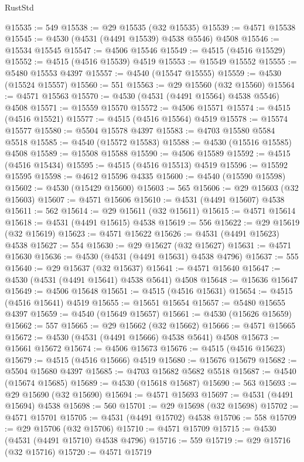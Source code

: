 \begin{lexlean}{RustStd}
\begin{coremodule}
{\begin{coremodule}
{{{{{{{{{{{{{{{{{{{{{{{{{{{{{{{{{{{{{{{{{{{{{{{{{{{{{{{@15535 := 549
@15538 := @29 @15535 (@32 @15535)
@15539 := @4571 @15538
@15545 := @4530 (@4531 (@4491 @15539) @4538 @5546) @4508
@15546 := @15534 @15545
@15547 := @4506 @15546
@15549 := @4515 (@4516 @15529)
@15552 := @4515 (@4516 @15539) @4519
@15553 := @15549 @15552
@15555 := @5480 @15553 @4397
@15557 := @4540 (@15547 @15555)
@15559 := @4530 (@15524 @15557)
@15560 := 551
@15563 := @29 @15560 (@32 @15560)
@15564 := @4571 @15563
@15570 := @4530 (@4531 (@4491 @15564) @4538 @5546) @4508
@15571 := @15559 @15570
@15572 := @4506 @15571
@15574 := @4515 (@4516 @15521)
@15577 := @4515 (@4516 @15564) @4519
@15578 := @15574 @15577
@15580 := @5504 @15578 @4397
@15583 := @4703 @15580 @5584 @5518
@15585 := @4540 (@15572 @15583)
@15588 := @4530 (@15516 @15585) @4508
@15589 := @15508 @15588
@15590 := @4506 @15589
@15592 := @4515 (@4516 @15434)
@15595 := @4515 (@4516 @15513) @4519
@15596 := @15592 @15595
@15598 := @4612 @15596 @4335
@15600 := @4540 (@15590 @15598)
@15602 := @4530 (@15429 @15600)
@15603 := 565
@15606 := @29 @15603 (@32 @15603)
@15607 := @4571 @15606
@15610 := @4531 (@4491 @15607) @4538
@15611 := 562
@15614 := @29 @15611 (@32 @15611)
@15615 := @4571 @15614
@15618 := @4531 (@4491 @15615) @4538
@15619 := 556
@15622 := @29 @15619 (@32 @15619)
@15623 := @4571 @15622
@15626 := @4531 (@4491 @15623) @4538
@15627 := 554
@15630 := @29 @15627 (@32 @15627)
@15631 := @4571 @15630
@15636 := @4530 (@4531 (@4491 @15631) @4538 @4796)
@15637 := 555
@15640 := @29 @15637 (@32 @15637)
@15641 := @4571 @15640
@15647 := @4530 (@4531 (@4491 @15641) @4538 @5641) @4508
@15648 := @15636 @15647
@15649 := @4506 @15648
@15651 := @4515 (@4516 @15631)
@15654 := @4515 (@4516 @15641) @4519
@15655 := @15651 @15654
@15657 := @5480 @15655 @4397
@15659 := @4540 (@15649 @15657)
@15661 := @4530 (@15626 @15659)
@15662 := 557
@15665 := @29 @15662 (@32 @15662)
@15666 := @4571 @15665
@15672 := @4530 (@4531 (@4491 @15666) @4538 @5641) @4508
@15673 := @15661 @15672
@15674 := @4506 @15673
@15676 := @4515 (@4516 @15623)
@15679 := @4515 (@4516 @15666) @4519
@15680 := @15676 @15679
@15682 := @5504 @15680 @4397
@15685 := @4703 @15682 @5682 @5518
@15687 := @4540 (@15674 @15685)
@15689 := @4530 (@15618 @15687)
@15690 := 563
@15693 := @29 @15690 (@32 @15690)
@15694 := @4571 @15693
@15697 := @4531 (@4491 @15694) @4538
@15698 := 560
@15701 := @29 @15698 (@32 @15698)
@15702 := @4571 @15701
@15705 := @4531 (@4491 @15702) @4538
@15706 := 558
@15709 := @29 @15706 (@32 @15706)
@15710 := @4571 @15709
@15715 := @4530 (@4531 (@4491 @15710) @4538 @4796)
@15716 := 559
@15719 := @29 @15716 (@32 @15716)
@15720 := @4571 @15719
}}}}}}}}}}}}}}}}}}}}}}}}}}}}}}}}}}}}}}}}}}}}}}}}}}}}}}}
\end{coremodule}}
\end{coremodule}
\end{lexlean}
